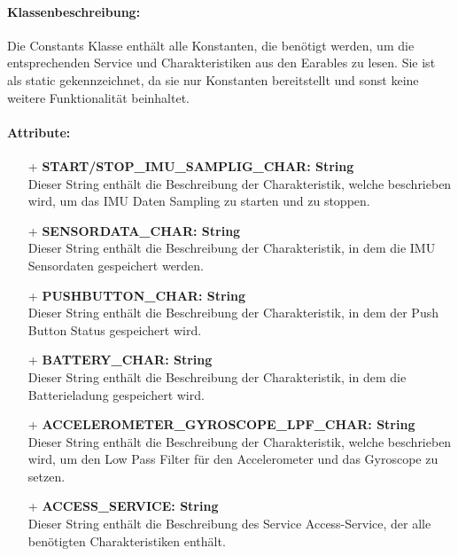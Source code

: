 \documentclass[a4paper,12pt]{article}
\begin{document}
\paragraph{Klassenbeschreibung:}
Die Constants Klasse enthält alle Konstanten, die benötigt werden, um die entsprechenden Service und Charakteristiken aus den \Gls{Earables} zu lesen. Sie ist als static gekennzeichnet, da sie nur Konstanten bereitstellt und sonst keine weitere Funktionalität beinhaltet.

\paragraph{Attribute:}
\begin{itemize}
	\item[+] \textbf{START/STOP\_IMU\_SAMPLIG\_CHAR: String}\\ Dieser String enthält die Beschreibung der Charakteristik, welche beschrieben wird,  um das IMU Daten Sampling zu starten und zu stoppen.
	\item[+] \textbf{SENSORDATA\_CHAR: String}\\ Dieser String enthält die Beschreibung der Charakteristik, in dem die IMU Sensordaten gespeichert werden.
	\item[+] \textbf{PUSHBUTTON\_CHAR: String} \\Dieser String enthält die Beschreibung der Charakteristik, in dem der Push Button Status gespeichert wird.
	\item[+] \textbf{BATTERY\_CHAR: String}\\ Dieser String enthält die Beschreibung der Charakteristik, in dem die Batterieladung gespeichert wird.
	\item[+] \textbf{ACCELEROMETER\_GYROSCOPE\_LPF\_CHAR: String}\\ Dieser String enthält die Beschreibung der Charakteristik, welche beschrieben wird, um den Low Pass Filter für den Accelerometer und das Gyroscope zu setzen.
\item[+] \textbf{ACCESS\_SERVICE: String}\\ Dieser String enthält die Beschreibung des Service Access-Service, der alle benötigten Charakteristiken enthält.
\end{itemize}
\end{document}
